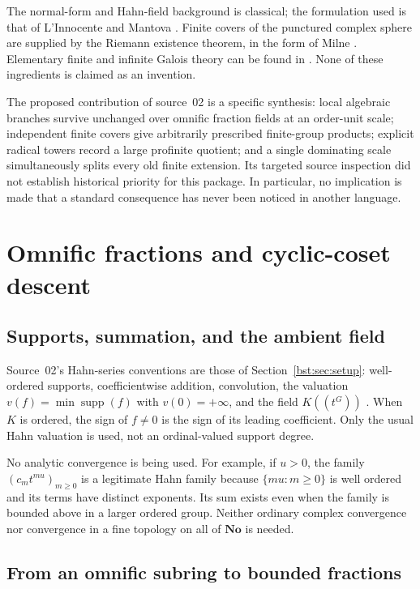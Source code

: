 \documentclass[11pt,letterpaper]{article}
\theoremstyle{definition}
\theoremstyle{remark}
\newcommand{\No}{\mathbf{No}}
\newcommand{\supp}{\operatorname{supp}}
\newcommand{\HH}[2]{#1((t^{#2}))}
\begin{document}
The normal-form and Hahn-field background is classical; the formulation
used is that of L'Innocente and Mantova \cite[Sections 2.1, 2.3--2.4]{LM24}. Finite
covers of the punctured complex sphere are supplied by the Riemann existence
theorem, in the form of Milne \cite[Theorem~21.3]{MilneEC}. Elementary finite
and infinite Galois theory can be found in \cite{MilneFT}. None of these
ingredients is claimed as an invention.

The proposed contribution of source~02 is a specific synthesis: local
algebraic branches survive unchanged over omnific fraction fields at an
order-unit scale; independent finite covers give arbitrarily prescribed
finite-group products; explicit radical towers record a large profinite
quotient; and a single dominating scale simultaneously splits every old
finite extension. Its targeted source inspection did not establish
historical priority for this package. In particular, no implication is made
that a standard consequence has never been noticed in another language.

\section{Omnific fractions and cyclic-coset descent}\label{bst:gr:sec:descent}

\subsection{Supports, summation, and the ambient field}

Source~02's Hahn-series conventions are those of Section~\ref{bst:sec:setup}:
well-ordered supports, coefficientwise addition, convolution, the valuation
$v(f)=\min\supp(f)$ with $v(0)=+\infty$, and the field
$\HH KG$ \cite[Fact~2.1.1]{LM24}. When $K$ is ordered, the sign of $f\ne0$ is
the sign of its leading coefficient. Only the usual Hahn valuation is used,
not an ordinal-valued support degree.

No analytic convergence is being used. For example, if $u>0$, the family
$(c_m t^{mu})_{m\geq0}$ is a legitimate Hahn family because $\{mu:m\geq0\}$
is well ordered and its terms have distinct exponents. Its sum exists even
when the family is bounded above in a larger ordered group. Neither ordinary
complex convergence nor convergence in a fine topology on all of $\No$ is
needed.

\subsection{From an omnific subring to bounded fractions}
\end{document}
